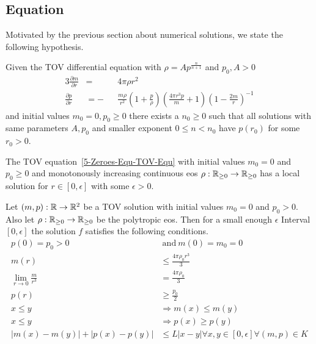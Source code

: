 \subsection{\texorpdfstring{}{TOV} Equation}
\label{subsec:5-Zeroes-TOV-Equ}
Motivated by the previous section about numerical solutions, we state the following hypothesis.
\begin{hypothesis}
	Given the \ac{TOV} differential equation with $\rho=Ap^{\frac{n}{n+1}}$ and $p_0,A>0$
	\begin{alignat}{3}
		\frac{\partial m}{\partial r} &= &&4\pi\rho r^2\\
		\frac{\partial p}{\partial r} &= -&&\frac{m\rho}{r^2}\left(1+\frac{p}{\rho}\right)\left(\frac{4\pi r^3 p}{m}+1\right)\left(1-\frac{2m}{r}\right)^{-1}
		\label{5-Zeroes-Equ-TOV-Equ}
	\end{alignat}
	and initial values $m_0=0,p_0\geq0$ there exists a $n_0\geq0$ such that all solutions with same parameters $A,p_0$ and smaller exponent $0\leq n<n_0$ have $p(r_0)$ for some $r_0>0$.
\end{hypothesis}
\begin{lemma}
	The \ac{TOV} equation~\ref{5-Zeroes-Equ-TOV-Equ} with initial values $m_0=0$ and $p_0\geq0$ and monotonously increasing continuous \ac{eos} $\rho:\mathbb{R}_{\geq0}\rightarrow\mathbb{R}_{\geq0}$ has a local solution for $r\in[0,\epsilon]$ with some $\epsilon>0$.
\end{lemma}
\begin{lemma}
	\label{5-Zeroes-Lem-TOV-Conditions}
	Let $(m,p):\mathbb{R}\rightarrow\mathbb{R}^2$ be a \ac{TOV} solution with initial values $m_0=0$ and $p_0>0$.
	Also let $\rho:\mathbb{R}_{\geq0}\rightarrow\mathbb{R}_{\geq0}$ be the polytropic \ac{eos}.
	Then for a small enough $\epsilon$ Interval $[0,\epsilon]$ the solution $f$ satisfies the following conditions.
	\begin{align}
		p(0)=p_0>0 &\mathrm{\ and\ } m(0)=m_0=0\label{5-Zeroes-Equ-TOV-Conditions-0}\\
		m(r) &\leq \frac{4\pi\rho_0 r^3}{3}\label{5-Zeroes-Equ-TOV-Conditions-1}\\
		\lim_{r\rightarrow0}\frac{m}{r^3}&=\frac{4\pi\rho_0}{3}\label{5-Zeroes-Equ-TOV-Conditions-2}\\
		p(r)&\geq\frac{p_0}{2}\label{5-Zeroes-Equ-TOV-Conditions-3}\\
		x\leq y&\Rightarrow m(x)\leq m(y)\label{5-Zeroes-Equ-TOV-Conditions-4}\\
		x\leq y&\Rightarrow p(x)\geq p(y)\label{5-Zeroes-Equ-TOV-Conditions-5}\\
		|m(x)-m(y)|+|p(x)-p(y)|&\leq L|x-y|\forall x,y\in[0,\epsilon]\forall(m,p)\in K\label{5-Zeroes-Equ-TOV-Conditions-6}
	\end{align}
\end{lemma}
